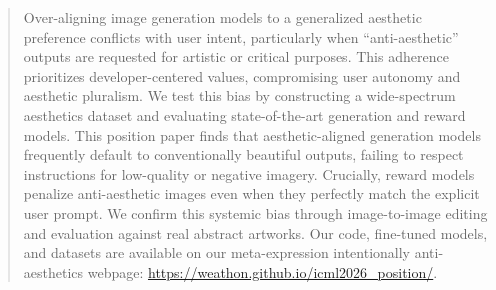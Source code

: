 \begin{abstract}
Over-aligning image generation models to a generalized aesthetic preference conflicts with user intent, particularly when ``anti-aesthetic'' outputs are requested for artistic or critical purposes. This adherence prioritizes developer-centered values, compromising user autonomy and aesthetic pluralism. We test this bias by constructing a wide-spectrum aesthetics dataset and evaluating state-of-the-art generation and reward models. This position paper finds that aesthetic-aligned generation models frequently default to conventionally beautiful outputs, failing to respect instructions for low-quality or negative imagery. Crucially, reward models penalize anti-aesthetic images even when they perfectly match the explicit user prompt. We confirm this systemic bias through image-to-image editing and evaluation against real abstract artworks. Our code, fine-tuned models, and datasets are available on our meta-expression intentionally anti-aesthetics webpage: \url{https://weathon.github.io/icml2026_position/}. 
\end{abstract}